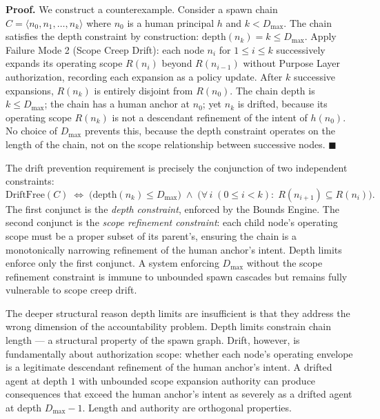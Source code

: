 \medskip
\noindent\textbf{Proof.} We construct a counterexample. Consider a spawn chain $C = \langle n_0, n_1, \ldots, n_k \rangle$ where $n_0$ is a human principal $h$ and $k < D_{\max}$. The chain satisfies the depth constraint by construction: $\mathrm{depth}(n_k) = k \leq D_{\max}$. Apply Failure Mode 2 (Scope Creep Drift): each node $n_i$ for $1 \leq i \leq k$ successively expands its operating scope $R(n_i)$ beyond $R(n_{i-1})$ without Purpose Layer authorization, recording each expansion as a policy update. After $k$ successive expansions, $R(n_k)$ is entirely disjoint from $R(n_0)$. The chain depth is $k \leq D_{\max}$; the chain has a human anchor at $n_0$; yet $n_k$ is drifted, because its operating scope $R(n_k)$ is not a descendant refinement of the intent of $h(n_0)$. No choice of $D_{\max}$ prevents this, because the depth constraint operates on the length of the chain, not on the scope relationship between successive nodes. $\blacksquare$

The drift prevention requirement is precisely the conjunction of two independent constraints:
\begin{equation}
\mathrm{DriftFree}(C) \;\iff\; \bigl( \mathrm{depth}(n_k) \leq D_{\max} \bigr) \;\land\; \bigl( \forall\, i \; (0 \leq i < k):\; R(n_{i+1}) \subseteq R(n_i) \bigr).
\label{eq:rs-drift-prevention-constraint}
\end{equation}
The first conjunct is the \emph{depth constraint}, enforced by the Bounds Engine. The second conjunct is the \emph{scope refinement constraint}: each child node's operating scope must be a proper subset of its parent's, ensuring the chain is a monotonically narrowing refinement of the human anchor's intent. Depth limits enforce only the first conjunct. A system enforcing $D_{\max}$ without the scope refinement constraint is immune to unbounded spawn cascades but remains fully vulnerable to scope creep drift.

The deeper structural reason depth limits are insufficient is that they address the wrong dimension of the accountability problem. Depth limits constrain chain length — a structural property of the spawn graph. Drift, however, is fundamentally about authorization scope: whether each node's operating envelope is a legitimate descendant refinement of the human anchor's intent. A drifted agent at depth $1$ with unbounded scope expansion authority can produce consequences that exceed the human anchor's intent as severely as a drifted agent at depth $D_{\max} - 1$. Length and authority are orthogonal properties.

